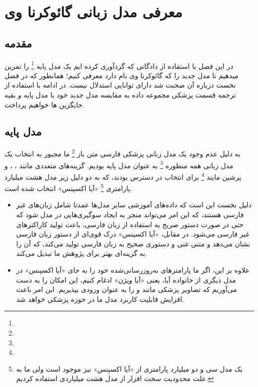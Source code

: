 \chapter{
	معرفی مدل زبانی گائوکرنا وی
}
\section{
مقدمه
}
در این فصل با استفاده از دادگانی که گردآوری کرده ایم یک مدل پایه
\footnote{}
را تمرین میدهیم تا مدل جدید را که گائوکرنا وی نام دارد معرفی کنیم؛ همانطور که در فصل نخست درباره آن صحبت شد دارای توانایی استدلال نیست.
در ادامه با استفاده از ترجمه قسمت پزشکی مجموعه داده
به مقایسه مدل جدید خود با مدل پایه و بقیه جایگزین ها خواهیم پرداخت.

\section{مدل پایه}
به دلیل عدم وجود یک مدل زبانی پزشکی فارسی متن باز
\footnote{}
ما مجبور به انتخاب یک مدل زبانی همه منظوره
\footnote{}
به عنوان مدل پایه بودیم.
گزینه‌های متعددی مانند
\cite{b70}
، 
\cite{b71}
، 
\cite{b72}
و پرشین مایند
\footnote{}
\cite{b73}
برای انتخاب در دسترس بودند، که به دو دلیل زیر مدل هشت میلیارد پارامتری
\footnote{
یک مدل سی و دو میلیارد پارامتری از «آیا اکسپنس» نیز موجود است ولی ما به علت محدودیت سخت افزار از مدل هشت میلیاردی استفاده کردیم.
}
«آیا اکسپنس» انتخاب شده است.

\begin{itemize}
    \item
دلیل نخست این است که داده‌های آموزشی سایر مدل‌ها عمدتا شامل زبان‌های غیر فارسی هستند، که این امر می‌تواند منجر به ایجاد سوگیری‌هایی در مدل شود که حتی در صورت دستور صریح به استفاده از زبان فارسی، باعث تولید کاراکترهای غیر فارسی می‌شود. در مقابل،
«آیا اکسپنس» درک قوی‌ای از دستور زبان فارسی نشان می‌دهد و متنی غنی و دستوری صحیح به زبان فارسی تولید می‌کند، که آن را به گزینه‌ای بهتر برای پژوهش ما تبدیل می‌کند.

\item
علاوه بر این، اگر ما پارامترهای به‌روزرسانی‌شده خود را به جای «آیا اکسپنس»
در مدل دیگری از خانواده آیا، یعنی «آیا ویژن»
\cite{b74}
ادغام کنیم، این امکان را به دست می‌آوریم که تصاویر پزشکی مانند
و 
را به عنوان ورودی بپذیریم. این امر باعث افزایش قابلیت کاربرد مدل ما در حوزه پزشکی خواهد شد.
\end{itemize}

